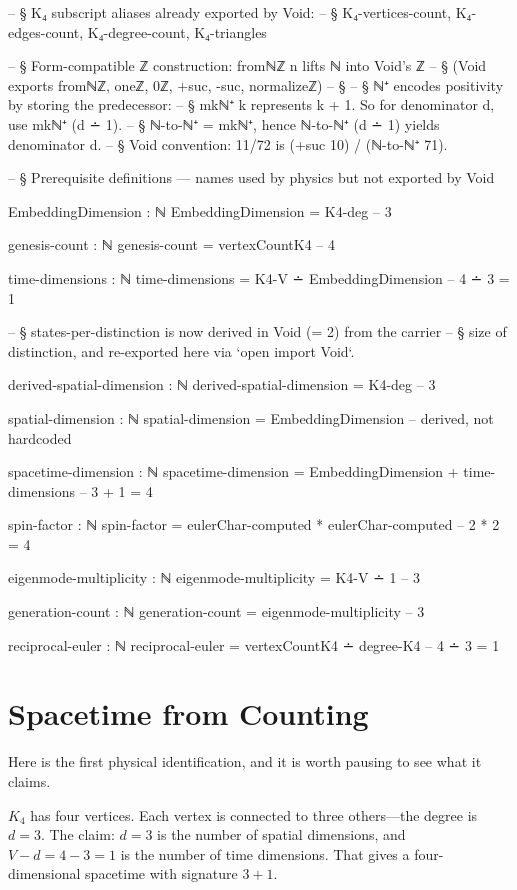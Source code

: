 \documentclass[11pt,a4paper]{book}
\begin{document}
\begin{code}
-- § K₄ subscript aliases already exported by Void:
-- § K₄-vertices-count, K₄-edges-count, K₄-degree-count, K₄-triangles

-- § Form-compatible ℤ construction: fromℕℤ n lifts ℕ into Void's ℤ
-- § (Void exports fromℕℤ, oneℤ, 0ℤ, +suc, -suc, normalizeℤ)
-- §
-- § ℕ⁺ encodes positivity by storing the predecessor:
-- §   mkℕ⁺ k represents k + 1.  So for denominator d, use mkℕ⁺ (d ∸ 1).
-- §   ℕ-to-ℕ⁺ = mkℕ⁺, hence ℕ-to-ℕ⁺ (d ∸ 1) yields denominator d.
-- §   Void convention: 11/72 is (+suc 10) / (ℕ-to-ℕ⁺ 71).

-- § Prerequisite definitions — names used by physics but not exported by Void

EmbeddingDimension : ℕ
EmbeddingDimension = K4-deg              -- 3

genesis-count : ℕ
genesis-count = vertexCountK4            -- 4

time-dimensions : ℕ
time-dimensions = K4-V ∸ EmbeddingDimension  -- 4 ∸ 3 = 1

-- § states-per-distinction is now derived in Void (= 2) from the carrier
-- § size of distinction, and re-exported here via `open import Void`.

derived-spatial-dimension : ℕ
derived-spatial-dimension = K4-deg            -- 3

spatial-dimension : ℕ
spatial-dimension = EmbeddingDimension        -- derived, not hardcoded

spacetime-dimension : ℕ
spacetime-dimension = EmbeddingDimension + time-dimensions  -- 3 + 1 = 4

spin-factor : ℕ
spin-factor = eulerChar-computed * eulerChar-computed  -- 2 * 2 = 4

eigenmode-multiplicity : ℕ
eigenmode-multiplicity = K4-V ∸ 1        -- 3

generation-count : ℕ
generation-count = eigenmode-multiplicity -- 3

reciprocal-euler : ℕ
reciprocal-euler = vertexCountK4 ∸ degree-K4  -- 4 ∸ 3 = 1
\end{code}

\section{Spacetime from Counting}

Here is the first physical identification, and it is worth pausing to see what it claims.

$K_4$ has four vertices. Each vertex is connected to three others---the degree is $d = 3$. The claim: $d = 3$ is the number of spatial dimensions, and $V - d = 4 - 3 = 1$ is the number of time dimensions. That gives a four-dimensional spacetime with signature $3 + 1$.
\end{document}
